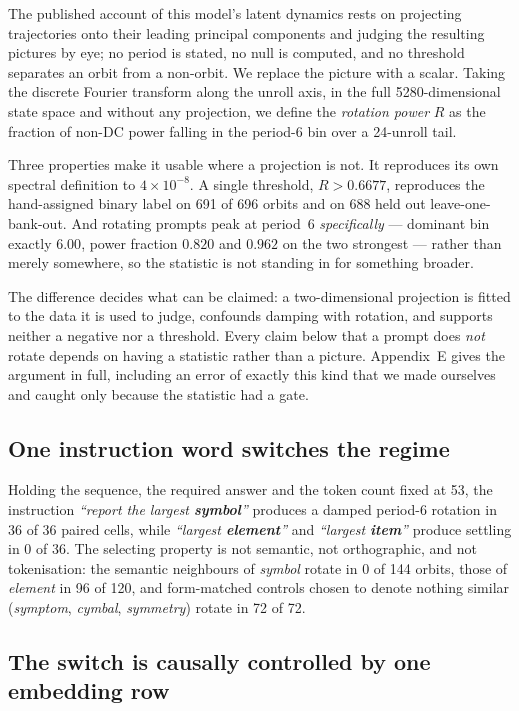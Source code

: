 \documentclass{zapiski}
\begin{document}
The published account of this model's latent dynamics rests on projecting trajectories onto their
leading principal components and judging the resulting pictures by eye; no period is stated, no
null is computed, and no threshold separates an orbit from a non-orbit. We replace the picture with
a scalar. Taking the discrete Fourier transform along the unroll axis, in the full
5280-dimensional state space and without any projection, we define the \emph{rotation power} $R$ as
the fraction of non-DC power falling in the period-6 bin over a 24-unroll tail.

Three properties make it usable where a projection is not. It reproduces its own spectral
definition to $4\times10^{-8}$. A single threshold, $R > 0.6677$, reproduces the hand-assigned
binary label on 691 of 696 orbits and on 688 held out leave-one-bank-out. And rotating prompts peak
at period~6 \emph{specifically} --- dominant bin exactly $6.00$, power fraction $0.820$ and $0.962$
on the two strongest --- rather than merely somewhere, so the statistic is not standing in for
something broader.

The difference decides what can be claimed: a two-dimensional projection is fitted to the data it
is used to judge, confounds damping with rotation, and supports neither a negative nor a threshold.
Every claim below that a prompt does \emph{not} rotate depends on having a statistic rather than a
picture. Appendix~E gives the argument in full, including an error of exactly this kind that we
made ourselves and caught only because the statistic had a gate.

\subsection{One instruction word switches the regime}

Holding the sequence, the required answer and the token count fixed at 53, the instruction
\emph{``report the largest \textbf{symbol}''} produces a damped period-6 rotation in 36 of 36
paired cells, while \emph{``largest \textbf{element}''} and \emph{``largest \textbf{item}''}
produce settling in 0 of 36. The selecting property is not semantic, not orthographic, and not
tokenisation: the semantic neighbours of \emph{symbol} rotate in 0 of 144 orbits, those of
\emph{element} in 96 of 120, and form-matched controls chosen to denote nothing similar
(\emph{symptom}, \emph{cymbal}, \emph{symmetry}) rotate in 72 of 72.

\subsection{The switch is causally controlled by one embedding row}
\end{document}

